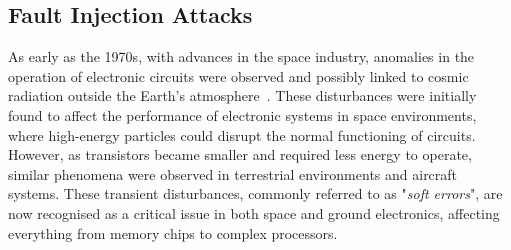
\subsection{Fault Injection Attacks}
As early as the 1970s, with advances in the space industry, anomalies in the operation of electronic circuits were observed and possibly linked to cosmic radiation outside the Earth's atmosphere~\cite{BSH-75-tns,Z-96-ibm,ZL-79-science}. These disturbances were initially found to affect the performance of electronic systems in space environments, where high-energy particles could disrupt the normal functioning of circuits. However, as transistors became smaller and required less energy to operate, similar phenomena were observed in terrestrial environments and aircraft systems. These transient disturbances, commonly referred to as "\textit{soft errors}", are now recognised as a critical issue in both space and ground electronics, affecting everything from memory chips to complex processors.

